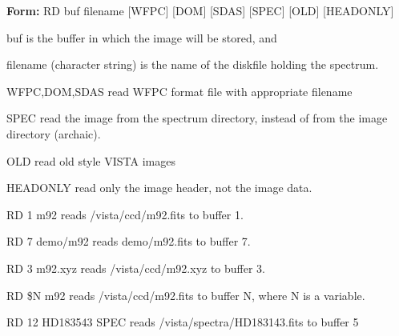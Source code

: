 {\newpage\clearpage
{}%
\begin{command}
  \item[\textbf{Form: } RD buf filename {[WFPC]} {[DOM]} {[SDAS]}
       {[SPEC]} {[OLD]} {[HEADONLY]}\hfill]{}
  \item[buf]{is the buffer in which the image will be stored, and}
  \item[filename]{(character string) is the name of the diskfile holding
       the spectrum.}
  \item[WFPC,DOM,SDAS]{read WFPC format file with appropriate filename}
  \item[SPEC]{read the image from the spectrum directory, instead of from
       the image directory (archaic).}
  \item[OLD]{read old style VISTA images}
  \item[HEADONLY]{read only the image header, not the image data.}
\end{command}%
\lthtmlfigureZ
\lthtmlcheckvsize\clearpage}

{\newpage\clearpage
{}%
\begin{example}
  \item[RD 1 m92\hfill]{reads /vista/ccd/m92.fits  to buffer 1.}
  \item[RD 7 demo/m92\hfill]{reads demo/m92.fits to buffer 7.}
  \item[RD 3 m92.xyz\hfill]{reads /vista/ccd/m92.xyz  to buffer 3.}
  \item[RD \$N m92\hfill]{reads /vista/ccd/m92.fits  to buffer N, where
       N is a variable.}
  \item[RD 12 HD183543 SPEC\hfill]{reads /vista/spectra/HD183143.fits to
buffer 5}
\end{example}%
\lthtmlfigureZ
\lthtmlcheckvsize\clearpage}

